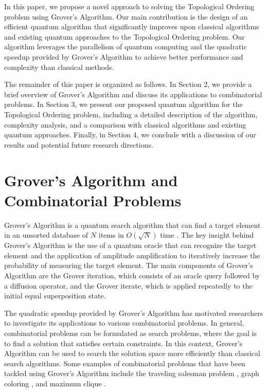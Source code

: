 In this paper, we propose a novel approach to solving the Topological Ordering problem using Grover's Algorithm. Our main contribution is the design of an efficient quantum algorithm that significantly improves upon classical algorithms and existing quantum approaches to the Topological Ordering problem. Our algorithm leverages the parallelism of quantum computing and the quadratic speedup provided by Grover's Algorithm to achieve better performance and complexity than classical methods.

The remainder of this paper is organized as follows. In Section 2, we provide a brief overview of Grover's Algorithm and discuss its applications to combinatorial problems. In Section 3, we present our proposed quantum algorithm for the Topological Ordering problem, including a detailed description of the algorithm, complexity analysis, and a comparison with classical algorithms and existing quantum approaches. Finally, in Section 4, we conclude with a discussion of our results and potential future research directions.

\section{Grover's Algorithm and Combinatorial Problems}

Grover's Algorithm is a quantum search algorithm that can find a target element in an unsorted database of $N$ items in $O(\sqrt{N})$ time \cite{Grover_1996}. The key insight behind Grover's Algorithm is the use of a quantum oracle that can recognize the target element and the application of amplitude amplification to iteratively increase the probability of measuring the target element. The main components of Grover's Algorithm are the Grover iteration, which consists of an oracle query followed by a diffusion operator, and the Grover iterate, which is applied repeatedly to the initial equal superposition state.

The quadratic speedup provided by Grover's Algorithm has motivated researchers to investigate its applications to various combinatorial problems. In general, combinatorial problems can be formulated as search problems, where the goal is to find a solution that satisfies certain constraints. In this context, Grover's Algorithm can be used to search the solution space more efficiently than classical search algorithms. Some examples of combinatorial problems that have been tackled using Grover's Algorithm include the traveling salesman problem \cite{Durr_Hoyer_1996}, graph coloring \cite{Shenvi_Kempe_Whaley_2003}, and maximum clique \cite{Ambainis_Kempe_2003}.

